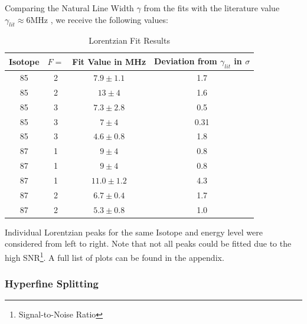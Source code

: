 \documentclass[12pt, a4paper]{article}
\begin{document}
Comparing the Natural Line Width $\gamma$ from the fits with the literature value $\gamma_{lit} \approx 6\si{\mega\hertz}$ \cite{script}, we receive the following values:

\begin{table}[htb]
\begin{center}
\caption{Lorentzian Fit Results}
\vspace{4mm}
\begin{tabular}{|c|c|c|c|}\hline
Isotope         & $F =$          & Fit Value in MHz   & Deviation from $\gamma_{lit}$ in $\sigma$ \\\hline
85              & 2              & $7.9 \pm 1.1$      & 1.7\\
85              & 2              & $13 \pm 4$         & 1.6\\
85              & 3              & $7.3 \pm 2.8$      & 0.5\\
85              & 3              & $7 \pm 4$          & 0.31\\
85              & 3              & $4.6 \pm 0.8$      & 1.8\\
87              & 1              & $9 \pm 4$          & 0.8\\
87              & 1              & $9 \pm 4$          & 0.8\\
87              & 1              & $11.0 \pm 1.2$     & 4.3\\
87              & 2              & $6.7 \pm 0.4$      & 1.7\\
87              & 2              & $5.3 \pm 0.8$      & 1.0\\\hline
\end{tabular}

\end{center}
\end{table}

Individual Lorentzian peaks for the same Isotope and energy level were considered from left to right. Note that not all peaks could be fitted due to the high SNR\footnote{Signal-to-Noise Ratio}. A full list of plots can be found in the appendix.

\subsubsection{Hyperfine Splitting}
\end{document}
